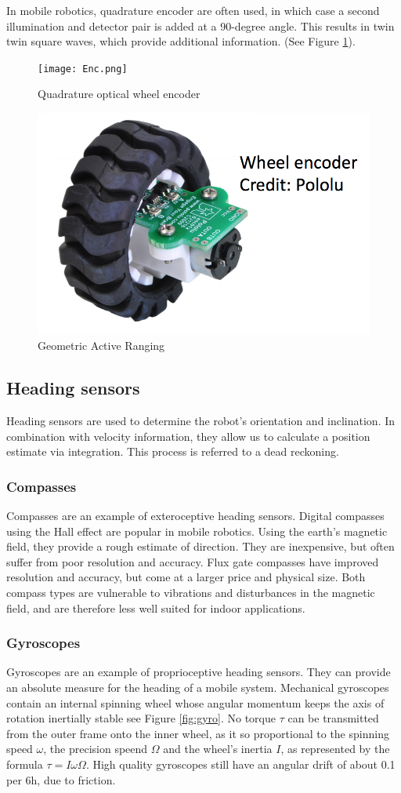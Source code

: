 \begin{itemize}
In mobile robotics, quadrature encoder are often used, in which case a second illumination and detector pair is added at a 90-degree angle. This results in twin twin square waves, which provide additional information. (See Figure \ref{fig:encoder}).

\begin{figure}[H]
\centering
        \texttt{[image: Enc.png]}
        \caption{Quadrature optical wheel encoder \cite{SNS}}
        \label{fig:encoder}
\end{figure}

\begin{figure}[H]
\centering
        \includegraphics[width =5 cm]{lecture_4/imgs/encoder2.png}
        \caption{Geometric Active Ranging}
\end{figure}



\subsection{Heading sensors}
Heading sensors are used to determine the robot’s orientation and inclination. In combination with velocity information, they allow us to calculate a position estimate via integration. This process is referred to a dead reckoning.
\subsubsection{Compasses}
Compasses are an example of exteroceptive heading sensors. Digital compasses using the Hall effect are popular in mobile robotics. Using the earth's magnetic field, they provide a rough estimate of direction. They are inexpensive, but often suffer from poor resolution and accuracy. Flux gate compasses have improved resolution and accuracy, but come at a larger price and physical size. Both compass types are vulnerable to vibrations and disturbances in the magnetic field, and are therefore less well suited for indoor applications.

\subsubsection{Gyroscopes}
Gyroscopes are an example of proprioceptive heading sensors. They can provide an absolute measure for the heading of a mobile system. Mechanical gyroscopes contain an internal spinning wheel whose angular momentum keeps the axis of rotation inertially stable see Figure \ref{fig:gyro}. No torque $\tau$ can be transmitted from the outer frame onto the inner wheel, as it so proportional to the spinning speed $\omega$, the precision speend $\Omega$ and the wheel's inertia $I$, as represented by the formula $\tau = I\omega\Omega$. High quality gyroscopes still have an angular drift of about 0.1 per 6h, due to friction.


\end{itemize}
